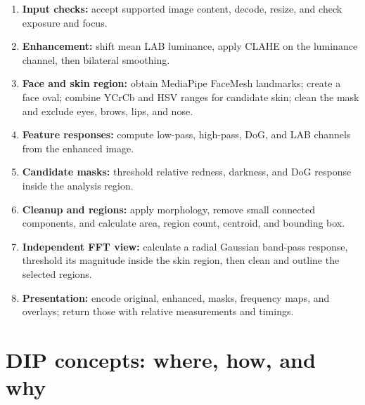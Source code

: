 \documentclass[11pt,a4paper]{article}
\begin{document}
\begin{enumerate}
  \item \textbf{Input checks:} accept supported image content, decode, resize, and check exposure and focus.
  \item \textbf{Enhancement:} shift mean LAB luminance, apply CLAHE on the luminance channel, then bilateral smoothing.
  \item \textbf{Face and skin region:} obtain MediaPipe FaceMesh landmarks; create a face oval; combine YCrCb and HSV ranges for candidate skin; clean the mask and exclude eyes, brows, lips, and nose.
  \item \textbf{Feature responses:} compute low-pass, high-pass, DoG, and LAB channels from the enhanced image.
  \item \textbf{Candidate masks:} threshold relative redness, darkness, and DoG response inside the analysis region.
  \item \textbf{Cleanup and regions:} apply morphology, remove small connected components, and calculate area, region count, centroid, and bounding box.
  \item \textbf{Independent FFT view:} calculate a radial Gaussian band-pass response, threshold its magnitude inside the skin region, then clean and outline the selected regions.
  \item \textbf{Presentation:} encode original, enhanced, masks, frequency maps, and overlays; return those with relative measurements and timings.
\end{enumerate}

\section{DIP concepts: where, how, and why}
\end{document}
